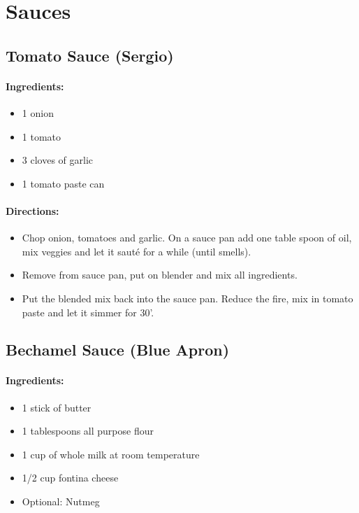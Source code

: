 \documentclass{article}
\begin{document}
\section{Sauces}

\subsection{Tomato Sauce (Sergio)}

\paragraph{Ingredients:}

\begin{itemize}
	\item 1 onion 
	\item 1 tomato 
	\item 3 cloves of garlic 
	\item 1 tomato paste can
\end{itemize}

\paragraph{Directions:}
\begin{itemize}
	\item Chop onion, tomatoes and garlic. On a sauce pan add one table spoon of oil, mix veggies and let it sauté for a while (until smells). 
	\item Remove from sauce pan, put on blender and mix all ingredients. 
	\item Put the blended mix back into the sauce pan. Reduce the fire, mix in tomato paste and let it simmer for 30'.
\end{itemize}

\subsection{Bechamel Sauce (Blue Apron)}

\paragraph{Ingredients:}

\begin{itemize}
\item 1 stick of butter
\item 1 tablespoons all purpose flour
\item 1 cup of whole milk at room temperature
\item 1/2 cup fontina cheese
\item Optional: Nutmeg
\end{itemize}
\end{document}
